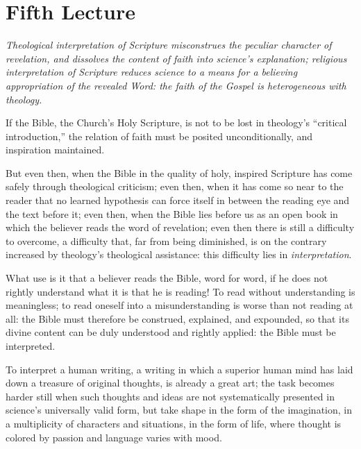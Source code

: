 \documentclass[12pt,a4paper]{book}
\begin{document}
\chapter*{Fifth Lecture}
\label{ch:forel5}

\begin{center}\itshape
Theological interpretation of Scripture misconstrues the peculiar character
of revelation, and dissolves the content of faith into science's explanation;
religious interpretation of Scripture reduces science to a means for a
believing appropriation of the revealed Word: the faith of the Gospel is
heterogeneous with theology.
\end{center}

If the Bible, the Church's Holy Scripture, is not to be lost in theology's
``critical introduction,'' the relation of faith must be posited unconditionally,
and inspiration maintained.

But even then, when the Bible in the quality of holy, inspired Scripture has come
safely through theological criticism; even then, when it has come so near to the
reader that no learned hypothesis can force itself in between the reading eye and
the text before it; even then, when the Bible lies before us as an open book in
which the believer reads the word of revelation; even then there is still a
difficulty to overcome, a difficulty that, far from being diminished, is on the
contrary increased by theology's theological assistance: this difficulty lies in
\emph{interpretation}.

What use is it that a believer reads the Bible, word for word, if he does not
rightly understand what it is that he is reading! To read without understanding is
meaningless; to read oneself into a misunderstanding is worse than not reading at
all: the Bible must therefore be construed, explained, and expounded, so that its
divine content
can be duly understood and rightly applied: the Bible must be interpreted.

To interpret a human writing, a writing in which a superior human mind has laid
down a treasure of original thoughts, is already a great art; the task becomes
harder still when such thoughts and ideas are not systematically presented in
science's universally valid form, but take shape in the form of the imagination, in
a multiplicity of characters and situations, in the form of life, where thought is
colored by passion and language varies with mood.
\end{document}
